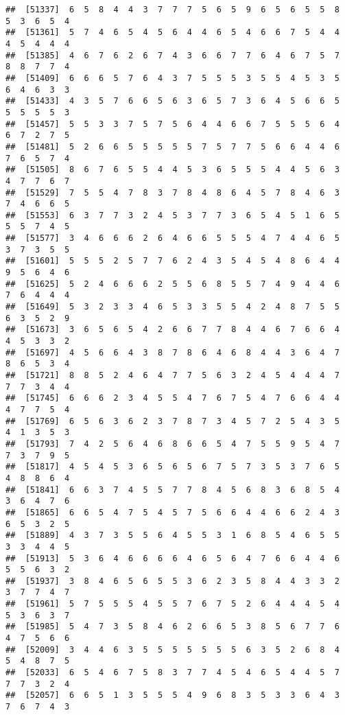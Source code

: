 \documentclass[
]{book}
\begin{document}
\begin{verbatim}
##  [51337]  6  5  8  4  4  3  7  7  7  5  6  5  9  6  5  6  5  5  8  5  3  6  5  4
##  [51361]  5  7  4  6  5  4  5  6  4  4  6  5  4  6  6  7  5  4  4  4  5  4  4  4
##  [51385]  4  6  7  6  2  6  7  4  3  6  6  7  7  6  4  6  7  5  7  8  8  7  7  4
##  [51409]  6  6  6  5  7  6  4  3  7  5  5  5  3  5  5  4  5  3  5  6  4  6  3  3
##  [51433]  4  3  5  7  6  6  5  6  3  6  5  7  3  6  4  5  6  6  5  5  5  5  5  3
##  [51457]  5  5  3  3  7  5  7  5  6  4  4  6  6  7  5  5  5  6  4  6  7  2  7  5
##  [51481]  5  2  6  6  5  5  5  5  5  7  5  7  7  5  6  6  4  4  6  7  6  5  7  4
##  [51505]  8  6  7  6  5  5  4  4  5  3  6  5  5  5  4  4  5  6  3  4  7  7  6  7
##  [51529]  7  5  5  4  7  8  3  7  8  4  8  6  4  5  7  8  4  6  3  7  4  6  6  5
##  [51553]  6  3  7  7  3  2  4  5  3  7  7  3  6  5  4  5  1  6  5  5  5  7  4  5
##  [51577]  3  4  6  6  6  2  6  4  6  6  5  5  5  4  7  4  4  6  5  3  7  3  5  5
##  [51601]  5  5  5  2  5  7  7  6  2  4  3  5  4  5  4  8  6  4  4  9  5  6  4  6
##  [51625]  5  2  4  6  6  6  2  5  5  6  8  5  5  7  4  9  4  4  6  7  6  4  4  4
##  [51649]  5  3  2  3  3  4  6  5  3  3  5  5  4  2  4  8  7  5  5  6  3  5  2  9
##  [51673]  3  6  5  6  5  4  2  6  6  7  7  8  4  4  6  7  6  6  4  4  5  3  3  2
##  [51697]  4  5  6  6  4  3  8  7  8  6  4  6  8  4  4  3  6  4  7  8  6  5  3  4
##  [51721]  8  8  5  2  4  6  4  7  7  5  6  3  2  4  5  4  4  4  7  7  7  3  4  4
##  [51745]  6  6  6  2  3  4  5  5  4  7  6  7  5  4  7  6  6  4  4  4  7  7  5  4
##  [51769]  6  5  6  3  6  2  3  7  8  7  3  4  5  7  2  5  4  3  5  4  1  3  5  3
##  [51793]  7  4  2  5  6  4  6  8  6  6  5  4  7  5  5  9  5  4  7  7  3  7  9  5
##  [51817]  4  5  4  5  3  6  5  6  5  6  7  5  7  3  5  3  7  6  5  4  8  8  6  4
##  [51841]  6  6  3  7  4  5  5  7  7  8  4  5  6  8  3  6  8  5  4  3  6  4  7  6
##  [51865]  6  6  5  4  7  5  4  5  7  5  6  6  4  4  6  6  2  4  3  6  5  3  2  5
##  [51889]  4  3  7  3  5  5  6  4  5  5  3  1  6  8  5  4  6  5  5  3  3  4  4  5
##  [51913]  5  3  6  4  6  6  6  6  4  6  5  6  4  7  6  6  4  4  6  5  5  6  3  2
##  [51937]  3  8  4  6  5  6  5  5  3  6  2  3  5  8  4  4  3  3  2  3  7  7  4  7
##  [51961]  5  7  5  5  5  4  5  5  7  6  7  5  2  6  4  4  4  5  4  5  3  6  3  7
##  [51985]  5  4  7  3  5  8  4  6  2  6  6  5  3  8  5  6  7  7  6  4  7  5  6  6
##  [52009]  3  4  4  6  3  5  5  5  5  5  5  5  6  3  5  2  6  8  4  5  4  8  7  5
##  [52033]  6  5  4  6  7  5  8  3  7  7  4  5  4  6  5  4  4  5  7  7  7  3  2  4
##  [52057]  6  6  5  1  3  5  5  5  4  9  6  8  3  5  3  3  6  4  3  7  6  7  4  3

\end{verbatim}
\end{document}
